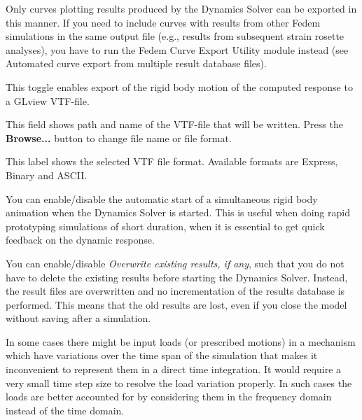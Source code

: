 {Only curves plotting results produced by the Dynamics Solver can be exported
in this manner. If you need to include curves with results from other Fedem
simulations in the same output file (e.g., results from subsequent strain
rosette analyses), you have to run the Fedem Curve Export Utility module instead
(see 
                {Automated curve export from multiple result database files}).

\begin{bulletlist}
  \setcounter{enumi}{3}
\item
  This toggle enables export of the rigid body motion of the computed
  response to a GLview VTF-file.
\item
  This field shows path and name of the VTF-file that will be written.
  Press the \textbf{Browse...} button to change file name or file
  format.
\item
  This label shows the selected VTF file format. Available formats are
  Express, Binary and ASCII.
\item
  You can enable/disable the automatic start of a simultaneous rigid
  body animation when the Dynamics Solver is started. This is useful
  when doing rapid prototyping simulations of short duration, when it is
  essential to get quick feedback on the dynamic response.
\item
  You can enable/disable {\sl Overwrite existing results, if any},
  such that you do not have to delete the existing results before
  starting the Dynamics Solver. Instead, the result files are overwritten
  and no incrementation of the results database is performed.
  This means that the old results are lost, even if you close the model
  without saving after a simulation.
\end{bulletlist}




In some cases there might be input loads (or prescribed motions) in a
mechanism which have variations over the time span of the simulation
that makes it inconvenient to represent them in a direct time integration.
It would require a very small time step size to resolve the load variation
properly. In such cases the loads are better accounted for by considering them
in the frequency domain instead of the time domain.

}
